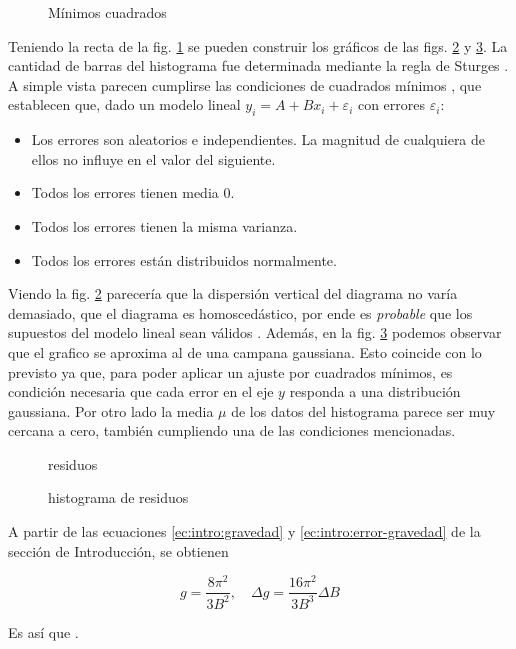\begin{figure}[H]
    \centering
    
    \caption{Mínimos cuadrados}
    \label{fig:datos:regresion}
\end{figure}

Teniendo la recta de la fig. \ref{fig:datos:regresion} se pueden construir los
gráficos de las figs. \ref{fig:datos:residuos} y \ref{fig:datos:histograma}.
La cantidad de barras del histograma fue determinada mediante la regla de 
Sturges \cite{sturges}.
A simple vista parecen cumplirse las condiciones de cuadrados mínimos 
\cite[pág. 527]{estadistica}, que establecen que, dado un modelo lineal
$y_i = A + Bx_i + \varepsilon_i$ con errores $\varepsilon_i$:

\begin{itemize}
    \item Los errores son aleatorios e independientes. La magnitud de 
        cualquiera de ellos no influye en el valor del siguiente.
    \item Todos los errores tienen media 0.
    \item Todos los errores tienen la misma varianza.
    \item Todos los errores están distribuidos normalmente.
\end{itemize}

Viendo la fig. \ref{fig:datos:residuos} parecería que la dispersión vertical
del diagrama no varía demasiado, que el diagrama es homoscedástico, por ende
es \textit{probable} que los supuestos del modelo lineal sean válidos
\cite[págs. 527-528]{estadistica}. Además, en la fig.
\ref{fig:datos:histograma} podemos observar que el grafico se aproxima al
de una campana gaussiana. Esto coincide con lo previsto ya que, para poder
aplicar un ajuste por cuadrados mínimos, es condición necesaria que cada
error en el eje $y$ responda a una distribución gaussiana. Por otro lado la
media $\mu$ de los datos del histograma parece ser muy cercana a cero, también cumpliendo una de las condiciones mencionadas.

\begin{figure}[H]
    \centering
    
    \caption{residuos}
    \label{fig:datos:residuos}
\end{figure}

\begin{figure}[H]
    \centering
    
    \caption{histograma de residuos}
    \label{fig:datos:histograma}
\end{figure}

A partir de las ecuaciones \ref{ec:intro:gravedad} y
\ref{ec:intro:error-gravedad} de la sección de Introducción, se
obtienen

\[
    g = \frac{8\pi^2}{3B^2}, \quad \Delta g = \frac{16\pi^2}{3B^3} \Delta B
\]

Es así que .
